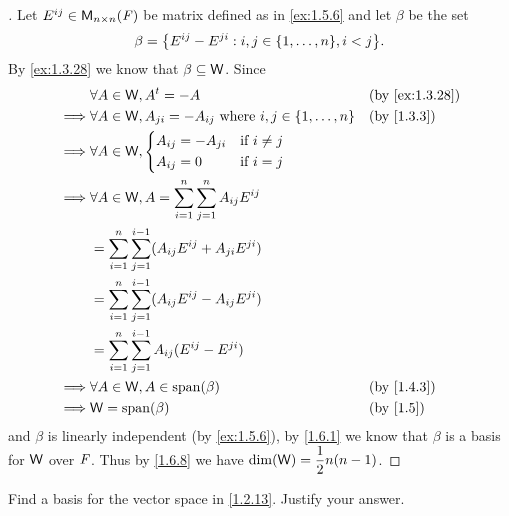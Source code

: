 \begin{proof}[]
  Let \(E^{i j} \in \ms[n][n][\F]\) be matrix defined as in \cref{ex:1.5.6} and let \(\beta\) be the set
  \[
    \beta = \set{E^{i j} - E^{j i} : i, j \in \set{1, \dots, n}, i < j}.
  \]
  By \cref{ex:1.3.28} we know that \(\beta \subseteq \mathsf{W}\).
  Since
  \begin{align*}
             & \forall A \in \W, \tp{A} = -A                                                  &  & \by{ex:1.3.28} \\
    \implies & \forall A \in \W, A_{j i} = -A_{i j} \text{ where } i, j \in \set{1, \dots, n} &  & \by{1.3.3}     \\
    \implies & \forall A \in \W, \begin{dcases}
                                   A_{i j} = -A_{j i} & \text{if } i \neq j \\
                                   A_{i j} = 0        & \text{if } i = j
                                 \end{dcases}                                         \\
    \implies & \forall A \in \W, A = \sum_{i = 1}^n \sum_{j = 1}^n A_{i j} E^{i j}                                \\
             & = \sum_{i = 1}^n \sum_{j = 1}^{i - 1} (A_{i j} E^{i j} + A_{j i} E^{j i})                          \\
             & = \sum_{i = 1}^n \sum_{j = 1}^{i - 1} (A_{i j} E^{i j} - A_{i j} E^{j i})                          \\
             & = \sum_{i = 1}^n \sum_{j = 1}^{i - 1} A_{i j} (E^{i j} - E^{j i})                                  \\
    \implies & \forall A \in \W, A \in \spn{\beta}                                            &  & \by{1.4.3}     \\
    \implies & \W = \spn{\beta}                                                               &  & \by{1.5}
  \end{align*}
  and \(\beta\) is linearly independent (by \cref{ex:1.5.6}), by \cref{1.6.1} we know that \(\beta\) is a basis for \(\mathsf{W}\) over \(\mathit{F}\).
  Thus by \cref{1.6.8} we have \(\dim(\mathsf{W}) = \dfrac{1}{2} n(n - 1)\).
\end{proof}

\begin{ex}\label{ex:1.6.18}
  Find a basis for the vector space in \cref{1.2.13}.
  Justify your answer.
\end{ex}


